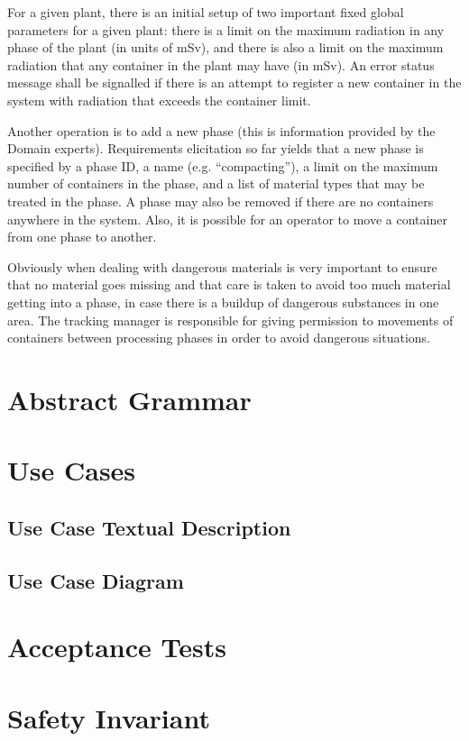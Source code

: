 \documentclass[fontsize=12pt,paper=letter,twoside]{scrartcl}
\begin{document}
For a given plant, there is an initial setup of two important fixed global parameters for a given plant: there is a limit on the maximum radiation in any phase of the plant (in units of mSv), and there is also a limit on the maximum radiation that any container in the plant may have (in mSv). An error status message shall be signalled if there is an attempt to register a new container in the system with radiation that exceeds the container limit.

Another operation is to add a new phase (this is information provided by the Domain experts). Requirements elicitation so far yields that a new phase is specified by a phase ID, a name (e.g. “compacting”), a limit on the maximum number of containers in the phase, and a list of material types that may be treated in the phase. A phase may also be removed if there are no containers anywhere in the system. Also, it is possible for an operator to move a container from one phase to another.

Obviously when dealing with dangerous materials is very important to ensure that no material goes missing and that care is taken to avoid too much material getting into a phase, in case there is a buildup of dangerous substances in one area. The tracking manager is responsible for giving permission to movements of containers between processing phases in order to avoid dangerous situations.

\newpage
\section{Abstract Grammar}




\newpage
\section{Use Cases}

\subsection{Use Case Textual Description}

\subsection{Use Case Diagram}


\newpage
\section{Acceptance Tests}

\newpage
\section{Safety Invariant}
\end{document}
